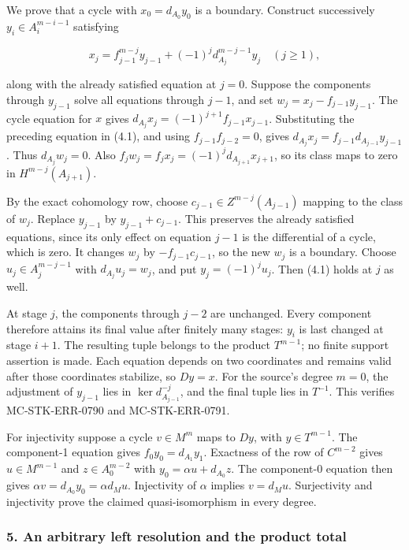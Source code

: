 We prove that a cycle with \(x_0=d_{A_0}y_0\) is a boundary. Construct successively \(y_i\in A_i^{m-i-1}\) satisfying

\[
x_j=f_{j-1}^{m-j}y_{j-1}+(-1)^j d_{A_j}^{m-j-1}y_j
\quad (j\geq1),                             \tag{4.1}
\]

along with the already satisfied equation at \(j=0\). Suppose the components through \(y_{j-1}\) solve all equations through \(j-1\), and set \(w_j=x_j-f_{j-1}y_{j-1}\). The cycle equation for \(x\) gives \(d_{A_j}x_j=(-1)^{j+1}f_{j-1}x_{j-1}\). Substituting the preceding equation in (4.1), and using \(f_{j-1}f_{j-2}=0\), gives \(d_{A_j}x_j=f_{j-1}d_{A_{j-1}}y_{j-1}\). Thus \(d_{A_j}w_j=0\). Also \(f_jw_j=f_jx_j=(-1)^j d_{A_{j+1}}x_{j+1}\), so its class maps to zero in \(H^{m-j}(A_{j+1})\).

By the exact cohomology row, choose \(c_{j-1}\in Z^{m-j}(A_{j-1})\) mapping to the class of \(w_j\). Replace \(y_{j-1}\) by \(y_{j-1}+c_{j-1}\). This preserves the already satisfied equations, since its only effect on equation \(j-1\) is the differential of a cycle, which is zero. It changes \(w_j\) by \(-f_{j-1}c_{j-1}\), so the new \(w_j\) is a boundary. Choose \(u_j\in A_j^{m-j-1}\) with \(d_{A_j}u_j=w_j\), and put \(y_j=(-1)^j u_j\). Then (4.1) holds at \(j\) as well.

At stage \(j\), the components through \(j-2\) are unchanged. Every component therefore attains its final value after finitely many stages: \(y_i\) is last changed at stage \(i+1\). The resulting tuple belongs to the product \(T^{m-1}\); no finite support assertion is made. Each equation depends on two coordinates and remains valid after those coordinates stabilize, so \(Dy=x\). For the source's degree \(m=0\), the adjustment of \(y_{j-1}\) lies in \(\ker d^{-j}_{A_{j-1}}\), and the final tuple lies in \(T^{-1}\). This verifies MC-STK-ERR-0790 and MC-STK-ERR-0791.

For injectivity suppose a cycle \(v\in M^m\) maps to \(Dy\), with \(y\in T^{m-1}\). The component-1 equation gives \(f_0y_0=d_{A_1}y_1\). Exactness of the row of \(C^{m-2}\) gives \(u\in M^{m-1}\) and \(z\in A_0^{m-2}\) with \(y_0=\alpha u+d_{A_0}z\). The component-0 equation then gives \(\alpha v=d_{A_0}y_0=\alpha d_Mu\). Injectivity of \(\alpha\) implies \(v=d_Mu\). Surjectivity and injectivity prove the claimed quasi-isomorphism in every degree.

\subsubsection{5. An arbitrary left resolution and the product total}\label{an-arbitrary-left-resolution-and-the-product-total}

